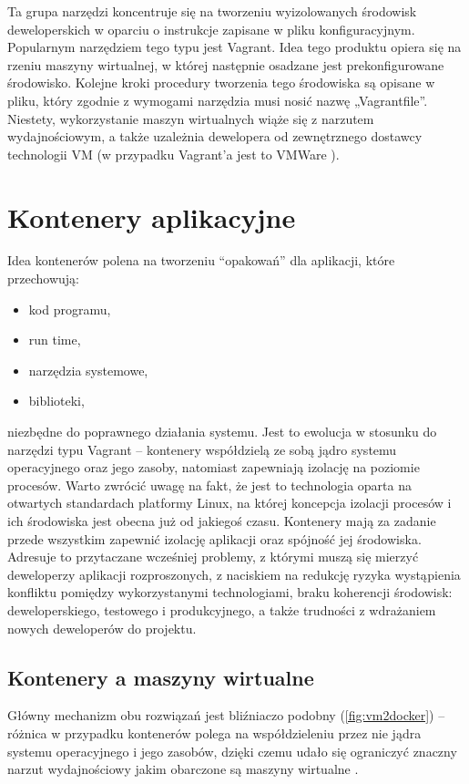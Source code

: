 Ta grupa narzędzi koncentruje się na tworzeniu wyizolowanych środowisk deweloperskich w oparciu o instrukcje zapisane w pliku konfiguracyjnym. Popularnym narzędziem tego typu jest Vagrant\cite{vagrant}. Idea tego produktu opiera się na rzeniu maszyny wirtualnej, w której następnie osadzane jest prekonfigurowane środowisko. Kolejne kroki procedury tworzenia tego środowiska są opisane w pliku, który zgodnie z wymogami narzędzia musi nosić nazwę „Vagrantfile”. Niestety, wykorzystanie maszyn wirtualnych wiąże się z narzutem wydajnościowym, a także uzależnia dewelopera od zewnętrznego dostawcy technologii VM (w przypadku Vagrant’a jest to VMWare \cite{vagrant}).

\section{Kontenery aplikacyjne}

Idea kontenerów polena na tworzeniu ``opakowań'' dla aplikacji, które przechowują:

\begin{itemize}
\item kod programu,
\item run time,
\item narzędzia systemowe,
\item biblioteki,
\end{itemize}
niezbędne do poprawnego działania systemu. Jest to ewolucja w stosunku do narzędzi typu Vagrant – kontenery współdzielą ze sobą jądro systemu operacyjnego oraz jego zasoby, natomiast zapewniają izolację na poziomie procesów. Warto zwrócić uwagę na fakt, że jest to technologia oparta na otwartych standardach platformy Linux, na której koncepcja izolacji procesów i ich środowiska jest obecna już od jakiegoś czasu. Kontenery mają za zadanie przede wszystkim zapewnić izolację aplikacji oraz spójność jej środowiska. Adresuje to przytaczane wcześniej problemy, z którymi muszą się mierzyć deweloperzy aplikacji rozproszonych, z naciskiem na redukcję ryzyka wystąpienia konfliktu pomiędzy wykorzystanymi technologiami, braku koherencji środowisk: deweloperskiego, testowego i produkcyjnego, a także trudności z wdrażaniem nowych deweloperów do projektu.

\subsection{Kontenery a maszyny wirtualne}

Główny mechanizm obu rozwiązań jest bliźniaczo podobny (\ref{fig:vm2docker}) – różnica w przypadku kontenerów polega na współdzieleniu przez nie jądra systemu operacyjnego i jego zasobów, dzięki czemu udało się ograniczyć znaczny narzut wydajnościowy jakim obarczone są maszyny wirtualne \cite{infoworld, vagrant, docker}.

